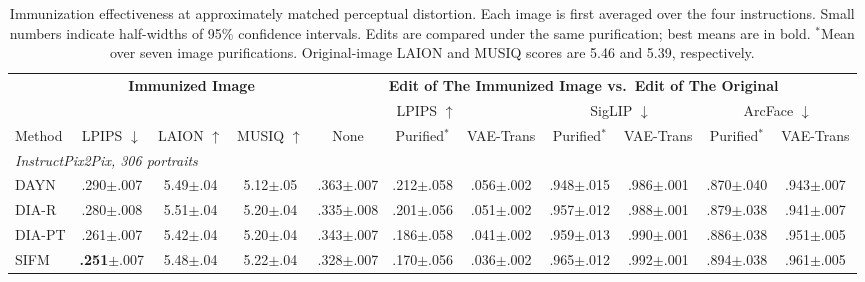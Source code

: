 \begin{table}[t]
  \centering
  \footnotesize
  \setlength{\tabcolsep}{2.4pt}
  \caption{Immunization effectiveness at approximately matched perceptual distortion. Each image is first averaged over the four instructions. Small numbers indicate half-widths of 95\% confidence intervals. Edits are compared under the same purification; best means are in bold. $^{*}$Mean over seven image purifications. Original-image LAION and MUSIQ scores are 5.46 and 5.39, respectively.
  }
  \label{tab:main}
  \begin{tabular}{l ccc ccc cc cc}
    \toprule
    & \multicolumn{3}{c}{\textbf{Immunized Image}} & \multicolumn{7}{c}{\textbf{Edit of The Immunized Image vs.\ Edit of The Original}} \\
    \cmidrule(lr){2-4} \cmidrule(l){5-11}
    & & & & \multicolumn{3}{c}{LPIPS $\uparrow$} & \multicolumn{2}{c}{SigLIP $\downarrow$} & \multicolumn{2}{c}{ArcFace $\downarrow$} \\
    \cmidrule(lr){5-7} \cmidrule(lr){8-9} \cmidrule(l){10-11}
    Method & LPIPS $\downarrow$ & LAION $\uparrow$ & MUSIQ $\uparrow$ & None & Purified$^{*}$ & VAE-Trans & Purified$^{*}$ & VAE-Trans & Purified$^{*}$ & VAE-Trans \\
    \midrule
    \multicolumn{11}{l}{\emph{InstructPix2Pix, 306 portraits}} \\
    DAYN & .290{\scriptsize$\pm$.007} & 5.49{\scriptsize$\pm$.04} & 5.12{\scriptsize$\pm$.05} & .363{\scriptsize$\pm$.007} & .212{\scriptsize$\pm$.058} & .056{\scriptsize$\pm$.002} & .948{\scriptsize$\pm$.015} & .986{\scriptsize$\pm$.001} & .870{\scriptsize$\pm$.040} & .943{\scriptsize$\pm$.007} \\
    DIA-R & .280{\scriptsize$\pm$.008} & 5.51{\scriptsize$\pm$.04} & 5.20{\scriptsize$\pm$.04} & .335{\scriptsize$\pm$.008} & .201{\scriptsize$\pm$.056} & .051{\scriptsize$\pm$.002} & .957{\scriptsize$\pm$.012} & .988{\scriptsize$\pm$.001} & .879{\scriptsize$\pm$.038} & .941{\scriptsize$\pm$.007} \\
    DIA-PT & .261{\scriptsize$\pm$.007} & 5.42{\scriptsize$\pm$.04} & 5.20{\scriptsize$\pm$.04} & .343{\scriptsize$\pm$.007} & .186{\scriptsize$\pm$.058} & .041{\scriptsize$\pm$.002} & .959{\scriptsize$\pm$.013} & .990{\scriptsize$\pm$.001} & .886{\scriptsize$\pm$.038} & .951{\scriptsize$\pm$.005} \\
    SIFM & \textbf{.251}{\scriptsize$\pm$.007} & 5.48{\scriptsize$\pm$.04} & 5.22{\scriptsize$\pm$.04} & .328{\scriptsize$\pm$.007} & .170{\scriptsize$\pm$.056} & .036{\scriptsize$\pm$.002} & .965{\scriptsize$\pm$.012} & .992{\scriptsize$\pm$.001} & .894{\scriptsize$\pm$.038} & .961{\scriptsize$\pm$.005} \\

\end{tabular}
\end{table}
